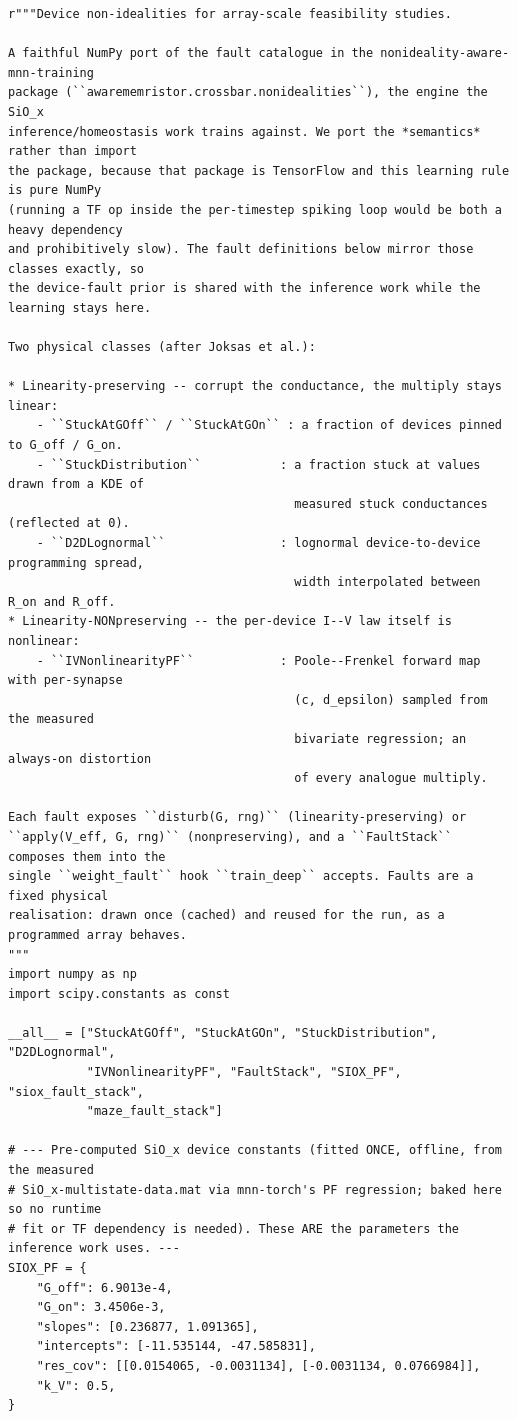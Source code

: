 \begin{lstlisting}[caption={mrl\_trace/device\_faults.py},label={lst:siox-src-device_faults}]
r"""Device non-idealities for array-scale feasibility studies.

A faithful NumPy port of the fault catalogue in the nonideality-aware-mnn-training
package (``awarememristor.crossbar.nonidealities``), the engine the SiO_x
inference/homeostasis work trains against. We port the *semantics* rather than import
the package, because that package is TensorFlow and this learning rule is pure NumPy
(running a TF op inside the per-timestep spiking loop would be both a heavy dependency
and prohibitively slow). The fault definitions below mirror those classes exactly, so
the device-fault prior is shared with the inference work while the learning stays here.

Two physical classes (after Joksas et al.):

* Linearity-preserving -- corrupt the conductance, the multiply stays linear:
    - ``StuckAtGOff`` / ``StuckAtGOn`` : a fraction of devices pinned to G_off / G_on.
    - ``StuckDistribution``           : a fraction stuck at values drawn from a KDE of
                                        measured stuck conductances (reflected at 0).
    - ``D2DLognormal``                : lognormal device-to-device programming spread,
                                        width interpolated between R_on and R_off.
* Linearity-NONpreserving -- the per-device I--V law itself is nonlinear:
    - ``IVNonlinearityPF``            : Poole--Frenkel forward map with per-synapse
                                        (c, d_epsilon) sampled from the measured
                                        bivariate regression; an always-on distortion
                                        of every analogue multiply.

Each fault exposes ``disturb(G, rng)`` (linearity-preserving) or
``apply(V_eff, G, rng)`` (nonpreserving), and a ``FaultStack`` composes them into the
single ``weight_fault`` hook ``train_deep`` accepts. Faults are a fixed physical
realisation: drawn once (cached) and reused for the run, as a programmed array behaves.
"""
import numpy as np
import scipy.constants as const

__all__ = ["StuckAtGOff", "StuckAtGOn", "StuckDistribution", "D2DLognormal",
           "IVNonlinearityPF", "FaultStack", "SIOX_PF", "siox_fault_stack",
           "maze_fault_stack"]

# --- Pre-computed SiO_x device constants (fitted ONCE, offline, from the measured
# SiO_x-multistate-data.mat via mnn-torch's PF regression; baked here so no runtime
# fit or TF dependency is needed). These ARE the parameters the inference work uses. ---
SIOX_PF = {
    "G_off": 6.9013e-4,
    "G_on": 3.4506e-3,
    "slopes": [0.236877, 1.091365],
    "intercepts": [-11.535144, -47.585831],
    "res_cov": [[0.0154065, -0.0031134], [-0.0031134, 0.0766984]],
    "k_V": 0.5,
}



\end{lstlisting}
